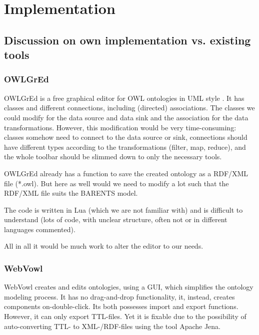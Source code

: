\documentclass[sigconf, nonacm]{acmart}
\begin{document}


\section{Implementation}\label{Section4}
    \subsection{Discussion on own implementation vs. existing tools}
        \subsubsection{OWLGrEd}
            OWLGrEd \cite{owlgred} is a free graphical editor for OWL ontologies in UML style \cite{owlgredW3}. 
            It has classes and different connections, including (directed) associations. 
            The classes we could modify for the data source and data sink and the association for the data transformations. 
            However, this modification would be very time-consuming: classes somehow need to connect to the data source or sink, connections should have different types according to the transformations (filter, map, reduce), and the whole toolbar should be slimmed down to only the necessary tools.

            OWLGrEd already has a function to save the created ontology as a RDF/XML file (*.owl). But here as well would we need to modify a lot such that the RDF/XML file suits the BARENTS model. 

            The code is written in Lua (which we are not familiar with) and is difficult to understand (lots of code, with unclear structure, often not or in different languages commented). 

            All in all it would be much work to alter the editor to our needs.

        \subsubsection{WebVowl}
            WebVowl creates and edits ontologies, using a GUI, which simplifies the ontology modeling process\cite{lohmann2015webvowl}.
            It has no drag-and-drop functionality, it, instead,  creates components on-double-click.
            Its both possesses import and export functions.
            However, it can only export TTL-files.
            Yet it is fixable due to the possibility of auto-converting TTL- to XML-/RDF-files using the tool Apache Jena.
\end{document}
